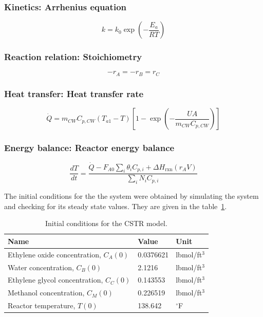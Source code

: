 \subsubsection*{Kinetics: Arrhenius equation}
\begin{equation}
    k
    =
    k_0
    \exp\left(
        -\frac{E_a}{RT}
    \right)
    \label{eq:arrhenius}
\end{equation}

\subsubsection*{Reaction relation: Stoichiometry}
\begin{equation}
    -r_A
    =
    -r_B
    =
    r_C
    \label{eq:stoichiometry}
\end{equation}

\subsubsection*{Heat transfer: Heat transfer rate}
\begin{equation}
    \dot{Q}
    =
    m_{CW} C_{p,CW}
    (T_{a1} - T)
    \left[
        1
        -
        \exp\left(
            -\frac{UA}{m_{CW} C_{p,CW}}
        \right)
    \right]
    \label{eq:heat_transfer}
\end{equation}

\subsubsection*{Energy balance: Reactor energy balance}
\begin{equation}
    \frac{dT}{dt}
    =
    \frac{
        \dot{Q}
        -
        F_{A0} \sum_i \theta_i C_{p,i}
        +
        \Delta H_{\mathrm{rxn}}(r_A V)
    }{
        \sum_i N_i C_{p,i}
    }
    \label{eq:energy_balance}
\end{equation}

The initial conditions for the the system were obtained by simulating the system and checking for its steady state values. They are given in the table~\ref{tab:initial_conditions}. 

\begin{table}[H]
    \centering
    \caption{Initial conditions for the CSTR model.}
    \label{tab:initial_conditions}
    \begin{tabular}{lll}
        \toprule
        Name & Value & Unit \\
        \midrule
        Ethylene oxide concentration, $C_A(0)$ & 0.0376621 & lbmol/ft$^3$ \\
        Water concentration, $C_B(0)$ & 2.1216 & lbmol/ft$^3$ \\
        Ethylene glycol concentration, $C_C(0)$ & 0.143553 & lbmol/ft$^3$ \\
        Methanol concentration, $C_M(0)$ & 0.226519 & lbmol/ft$^3$ \\
        Reactor temperature, $T(0)$ & 138.642 & $^\circ$F \\
        \bottomrule
    \end{tabular}
\end{table}

